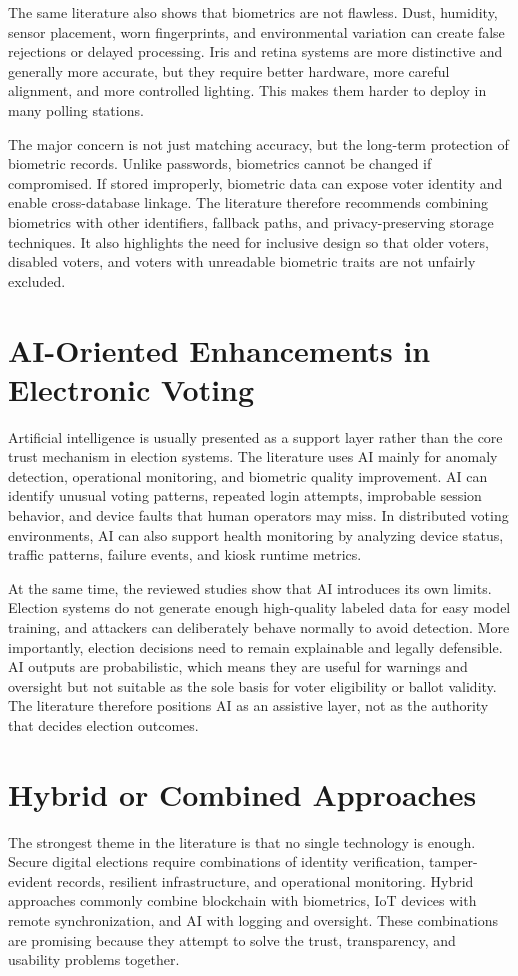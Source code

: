 The same literature also shows that biometrics are not flawless. Dust, humidity, sensor placement, worn fingerprints, and environmental variation can create false rejections or delayed processing. Iris and retina systems are more distinctive and generally more accurate, but they require better hardware, more careful alignment, and more controlled lighting. This makes them harder to deploy in many polling stations.

The major concern is not just matching accuracy, but the long-term protection of biometric records. Unlike passwords, biometrics cannot be changed if compromised. If stored improperly, biometric data can expose voter identity and enable cross-database linkage. The literature therefore recommends combining biometrics with other identifiers, fallback paths, and privacy-preserving storage techniques. It also highlights the need for inclusive design so that older voters, disabled voters, and voters with unreadable biometric traits are not unfairly excluded.

\section{AI-Oriented Enhancements in Electronic Voting}
Artificial intelligence is usually presented as a support layer rather than the core trust mechanism in election systems. The literature uses AI mainly for anomaly detection, operational monitoring, and biometric quality improvement. AI can identify unusual voting patterns, repeated login attempts, improbable session behavior, and device faults that human operators may miss. In distributed voting environments, AI can also support health monitoring by analyzing device status, traffic patterns, failure events, and kiosk runtime metrics.

At the same time, the reviewed studies show that AI introduces its own limits. Election systems do not generate enough high-quality labeled data for easy model training, and attackers can deliberately behave normally to avoid detection. More importantly, election decisions need to remain explainable and legally defensible. AI outputs are probabilistic, which means they are useful for warnings and oversight but not suitable as the sole basis for voter eligibility or ballot validity. The literature therefore positions AI as an assistive layer, not as the authority that decides election outcomes.

\section{Hybrid or Combined Approaches}
The strongest theme in the literature is that no single technology is enough. Secure digital elections require combinations of identity verification, tamper-evident records, resilient infrastructure, and operational monitoring. Hybrid approaches commonly combine blockchain with biometrics, IoT devices with remote synchronization, and AI with logging and oversight. These combinations are promising because they attempt to solve the trust, transparency, and usability problems together.


